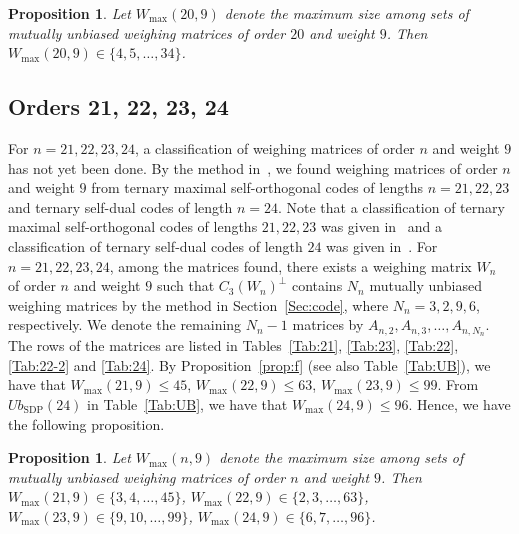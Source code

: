 \documentclass[12pt]{article}
\newtheorem{prop}[thm]{Proposition}
\theoremstyle{remark}
\begin{document}
\begin{prop}\label{prop:20}
Let $W_{\max}(20,9)$ denote 
the maximum size among sets of mutually
unbiased weighing matrices of order $20$ and weight $9$.
Then $W_{\max}(20,9) \in \{4,5,\ldots,34\}$.
\end{prop}



\subsection{Orders 21, 22, 23, 24}

For $n=21,22,23,24$,
a classification of weighing matrices of order $n$ and weight $9$ has not yet been done.
By the method in~\cite{HM}, we found weighing matrices of
order $n$ and weight $9$ from ternary maximal self-orthogonal codes of lengths
$n=21,22,23$ and ternary self-dual codes of length $n=24$.
Note that a classification of ternary maximal self-orthogonal codes of lengths $21,22,23$
was given in~\cite{AHS} and a classification of ternary self-dual codes of length 
$24$ was given in~\cite{HM24}.
For $n=21,22,23,24$,
among the matrices found, there exists a weighing matrix $W_{n}$ of order $n$ and weight $9$
such that 
$C_3(W_{n})^\perp$ contains $N_n$ mutually unbiased weighing matrices
by the method in Section~\ref{Sec:code}, 
where $N_n=3,2,9,6$, respectively.
We denote the remaining $N_n-1$ matrices by
$A_{n,2},A_{n,3},\ldots,A_{n,N_n}$.
The rows of the matrices are listed in Tables~\ref{Tab:21}, \ref{Tab:23},
\ref{Tab:22}, \ref{Tab:22-2} and \ref{Tab:24}.
By Proposition~\ref{prop:f} (see also Table~\ref{Tab:UB}),
we have that $W_{\max}(21,9) \le 45$,
$W_{\max}(22,9) \le 63$,
$W_{\max}(23,9) \le 99$.
From $Ub_{\text{SDP}}(24)$ in Table~\ref{Tab:UB},
we have that $W_{\max}(24,9) \le 96$.
Hence, we have the following proposition.

\begin{prop}\label{prop:21222324}
Let $W_{\max}(n,9)$ denote 
the maximum size among sets of mutually
unbiased weighing matrices of order $n$ and weight $9$.
Then $W_{\max}(21,9) \in \{3,4,\ldots,45\}$,
$W_{\max}(22,9) \in \{2,3,\ldots,63\}$,
$W_{\max}(23,9) \in \{9,10,\ldots,99\}$,
$W_{\max}(24,9) \in \{6,7,\ldots,96\}$.
\end{prop}
\end{document}

